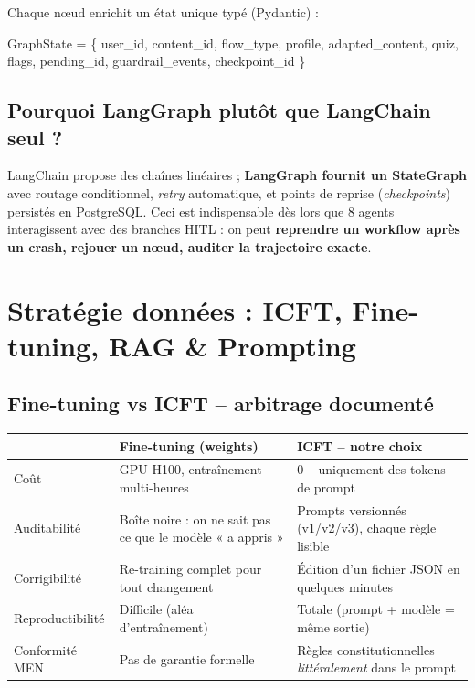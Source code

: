 \documentclass[11pt,a4paper]{article}
\begin{document}
Chaque nœud enrichit un état unique typé (Pydantic) :

\begin{tcolorbox}[colback=panel, colframe=rulecolor, boxrule=0.3pt, arc=1pt,
  left=8pt,right=8pt,top=4pt,bottom=4pt]
\small\ttfamily
GraphState = \{ user\_id, content\_id, flow\_type, profile, adapted\_content,
quiz, flags, pending\_id, guardrail\_events, checkpoint\_id \}
\end{tcolorbox}

\subsection{Pourquoi LangGraph plutôt que LangChain seul ?}

LangChain propose des chaînes linéaires ; \textbf{LangGraph fournit un StateGraph}
avec routage conditionnel, \emph{retry} automatique, et points de reprise (\emph{checkpoints})
persistés en PostgreSQL. Ceci est indispensable dès lors que 8 agents interagissent avec
des branches HITL : on peut \textbf{reprendre un workflow après un crash, rejouer un nœud,
auditer la trajectoire exacte}.

\newpage

\section{Stratégie données : ICFT, Fine-tuning, RAG \& Prompting}

\subsection{Fine-tuning vs ICFT -- arbitrage documenté}

\begin{center}
\small
\begin{tabular}{@{}p{3.2cm}p{5.6cm}p{5.6cm}@{}}
\toprule
                 & \textbf{Fine-tuning (weights)} & \textbf{ICFT -- notre choix} \\
\midrule
Coût             & GPU H100, entraînement multi-heures       & 0 \texteuro{} -- uniquement des tokens de prompt \\
Auditabilité     & Boîte noire : on ne sait pas ce que le modèle « a appris » & Prompts versionnés (v1/v2/v3), chaque règle lisible \\
Corrigibilité    & Re-training complet pour tout changement  & Édition d'un fichier JSON en quelques minutes \\
Reproductibilité & Difficile (aléa d'entraînement)           & Totale (prompt + modèle = même sortie) \\
Conformité MEN   & Pas de garantie formelle                  & Règles constitutionnelles \emph{littéralement} dans le prompt \\
\bottomrule
\end{tabular}
\end{center}
\end{document}
